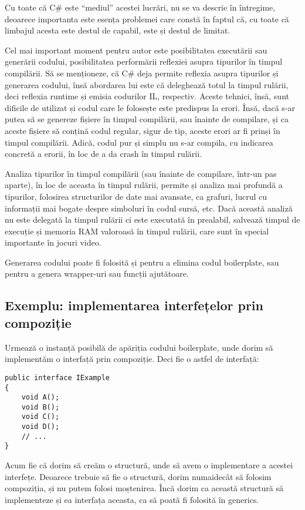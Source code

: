 \documentclass[a4paper,12pt]{report}
\begin{document}
Cu toate că C\# este ``mediul'' acestei lucrări, nu se va descrie în întregime,
deoarece importanta este esența problemei care constă în faptul că, cu toate că limbajul acesta este destul de capabil, este și destul de limitat.

Cel mai important moment pentru autor este posibilitatea executării sau generării codului,
posibilitatea performării reflexiei asupra tipurilor în timpul compilării.
Să se menționeze, că C\# deja permite reflexia asupra tipurilor și generarea codului, însă abordarea lui este că deleghează totul la timpul rulării, deci reflexia runtime și emisia codurilor IL, respectiv.
Aceste tehnici, însă, sunt dificile de utilizat și codul care le folosește este predispus la erori.
Însă, dacă s-ar putea să se genereze fișiere în timpul compilării, sau înainte de compilare, și ca aceste fișiere să conțină codul regular, sigur de tip, aceste erori ar fi prinși în timpul compilării.
Adică, codul pur și simplu nu s-ar compila, cu indicarea concretă a erorii, în loc de a da crash în timpul rulării.

Analiza tipurilor în timpul compilării (sau înainte de compilare, într-un pas aparte), în loc de aceasta în timpul rulării, permite și analiza mai profundă a tipurilor, folosirea structurilor de date mai avansate, ca grafuri, lucrul cu informații mai bogate despre simboluri în codul sursă, etc.
Dacă această analiză nu este delegată la timpul rulării ci este executată în prealabil, salvează timpul de execuție și memoria RAM valoroasă în timpul rulării, care sunt în special importante în jocuri video.

Generarea codului poate fi folosită și pentru a elimina codul boilerplate, sau pentru a genera wrapper-uri sau funcții ajutătoare.

\subsection{Exemplu: implementarea interfețelor prin compoziție}

Urmează o instanță posibilă de apăriția codului boilerplate, unde dorim să implementăm o interfață prin compoziție\cite{composition_interface_boilerplate}.
Deci fie o astfel de interfață:

\begin{verbatim}
public interface IExample
{
    void A();
    void B();
    void C();
    void D();
    // ...
}
\end{verbatim}

Acum fie că dorim să creăm o structură, unde să avem o implementare a acestei interfețe.
Deoarece trebuie să fie o structură, dorim numaidecât să folosim compoziția, și nu putem folosi moștenirea.
Încă dorim ca această structură să implementeze și ea interfața aceasta, ca să poată fi folosită în generics.
\end{document}
